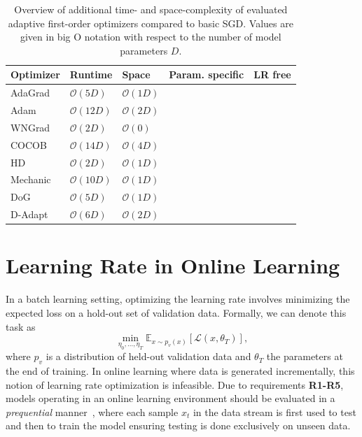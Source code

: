 \documentclass[runningheads]{llncs}
\newcommand{\cmark}{\ding{51}} %
\newcommand{\xmark}{\ding{55}} %
\begin{document}
\begin{table}[ht]
	\centering
	\scriptsize
	\caption{Overview of additional time- and space-complexity of evaluated adaptive first-order optimizers compared to basic SGD. Values are given in big O notation with respect to the number of model parameters $D$.}\label{tab:param_free_optims}
	\begin{tabular}{@{}lllcc@{}}
		\toprule
		Optimizer                & Runtime            & Space             & Param. specific & LR free \\ \midrule
		AdaGrad                  & $\mathcal{O}(5D)$  & $\mathcal{O}(1D)$ & \cmark          & \xmark  \\
		Adam                     & $\mathcal{O}(12D)$ & $\mathcal{O}(2D)$ & \cmark          & \xmark  \\
		WNGrad                   & $\mathcal{O}(2D)$  & $\mathcal{O}(0)$  & \xmark          & \xmark  \\
		COCOB                    & $\mathcal{O}(14D)$ & $\mathcal{O}(4D)$ & \cmark          & \cmark  \\
		HD \footnotemark[1]      & $\mathcal{O}(2D)$  & $\mathcal{O}(1D)$ & \xmark          & \xmark  \\
		Mechanic                 & $\mathcal{O}(10D)$ & $\mathcal{O}(1D)$ & \cmark          & \cmark  \\
		DoG \footnotemark[1]     & $\mathcal{O}(5D)$  & $\mathcal{O}(1D)$ & \xmark          & \cmark  \\
		D-Adapt \footnotemark[1] & $\mathcal{O}(6D)$  & $\mathcal{O}(2D)$ & \xmark          & \cmark  \\
		\bottomrule
	\end{tabular}
\end{table}

\section{Learning Rate in Online Learning}

In a batch learning setting, optimizing the learning rate involves minimizing the expected loss on a hold-out set of validation data.
Formally, we can denote this task as
\begin{equation}
	\label{eq:batch_lr_optim}
	\min_{\eta_0, \ldots, \eta_T} \mathbb{E}_{x \sim p_v(x)}[\mathcal{L}(x, \theta_T)],
\end{equation}
where $p_v$ is a distribution of held-out validation data and $\theta_T$ the parameters at the end of training.
In online learning where data is generated incrementally, this notion of learning rate optimization is infeasible.
Due to requirements \textbf{R1-R5}, models operating in an online learning environment should be evaluated in a \textit{prequential} manner~\cite{bifetMOAMassiveOnline2010}, where each sample $x_t$ in the data stream is first used to test and then to train the model ensuring testing is done exclusively on unseen data.
\end{document}
